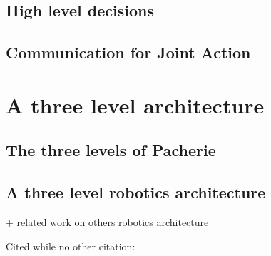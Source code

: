 \documentclass[a4paper,11pt,twoside]{StyleThese}
\begin{document}
\subsection{High level decisions}

\subsection{Communication for Joint Action}

\section{A three level architecture}

\subsection{The three levels of Pacherie}

\subsection{A three level robotics architecture}

+ related work on others robotics architecture


Cited while no other citation: \cite{goossens93}

\ifdefined{}
\else


\end{document}
